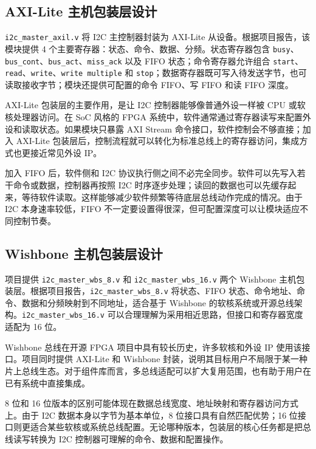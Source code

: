 \documentclass[12pt,a4paper]{article}
\numberwithin{equation}{section}
\begin{document}
\subsection{AXI-Lite 主机包装层设计}

\texttt{i2c\_master\_axil.v} 将 I2C 主控制器封装为 AXI-Lite 从设备。根据项目报告，该模块提供 4 个主要寄存器：状态、命令、数据、分频。状态寄存器包含 \texttt{busy}、\texttt{bus\_cont}、\texttt{bus\_act}、\texttt{miss\_ack} 以及 FIFO 状态；命令寄存器允许组合 \texttt{start}、\texttt{read}、\texttt{write}、\texttt{write multiple} 和 \texttt{stop}；数据寄存器既可写入待发送字节，也可读取接收字节；模块还提供可配置的命令 FIFO、写 FIFO 和读 FIFO 深度。

AXI-Lite 包装层的主要作用，是让 I2C 控制器能够像普通外设一样被 CPU 或软核处理器访问。在 SoC 风格的 FPGA 系统中，软件通常通过寄存器读写来配置外设和读取状态。如果模块只暴露 AXI Stream 命令接口，软件控制会不够直接；加入 AXI-Lite 包装层后，控制流程就可以转化为标准总线上的寄存器访问，集成方式也更接近常见外设 IP。

加入 FIFO 后，软件侧和 I2C 协议执行侧之间不必完全同步。软件可以先写入若干命令或数据，控制器再按照 I2C 时序逐步处理；读回的数据也可以先缓存起来，等待软件读取。这样能够减少软件频繁等待底层总线动作完成的情况。由于 I2C 本身速率较低，FIFO 不一定要设置得很深，但可配置深度可以让模块适应不同控制节奏。

\subsection{Wishbone 主机包装层设计}

项目提供 \texttt{i2c\_master\_wbs\_8.v} 和 \texttt{i2c\_master\_wbs\_16.v} 两个 Wishbone 主机包装层。根据项目报告，\texttt{i2c\_master\_wbs\_8.v} 将状态、FIFO 状态、命令地址、命令、数据和分频映射到不同地址，适合基于 Wishbone 的软核系统或开源总线架构。\texttt{i2c\_master\_wbs\_16.v} 可以合理理解为采用相近思路，但接口和寄存器宽度适配为 16 位。

Wishbone 总线在开源 FPGA 项目中具有较长历史，许多软核和外设 IP 使用该接口。项目同时提供 AXI-Lite 和 Wishbone 封装，说明其目标用户不局限于某一种片上总线生态。对于组件库而言，多总线适配可以扩大复用范围，也有助于用户在已有系统中直接集成。

8 位和 16 位版本的区别可能体现在数据总线宽度、地址映射和寄存器访问方式上。由于 I2C 数据本身以字节为基本单位，8 位接口具有自然匹配优势；16 位接口则更适合某些软核或系统总线配置。无论哪种版本，包装层的核心任务都是把总线读写转换为 I2C 控制器可理解的命令、数据和配置操作。
\end{document}
